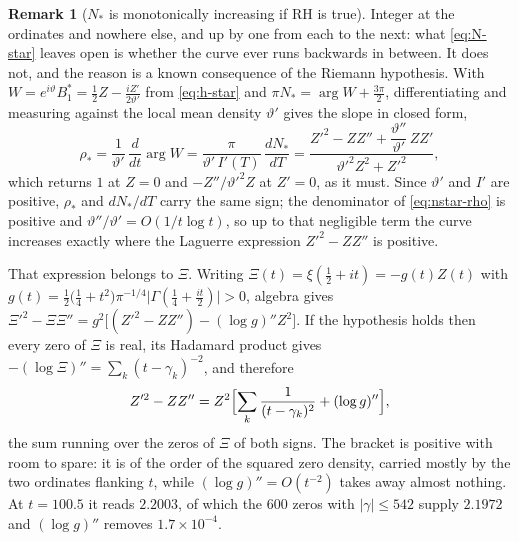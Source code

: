 \documentclass[11pt]{article}
\theoremstyle{definition}
\newtheorem{remark}[theorem]{Remark}
\begin{document}
\begin{remark}[$N_{\ast}$ is monotonically increasing if RH is true]
\label{rem:nstar-mono}
Integer at the ordinates and nowhere else, and up by one from each to the next:
what \eqref{eq:N-star} leaves open is whether the curve ever runs backwards in
between. It does not, and the reason is a known consequence of the Riemann
hypothesis. With $W=e^{i\vartheta}B_1^{\ast}=\tfrac12Z-\tfrac{iZ'}{2\vartheta'}$ from
\eqref{eq:h-star} and $\pi N_{\ast}=\arg W+\tfrac{3\pi}{2}$, differentiating
and measuring against the local mean density $\vartheta'$ gives the slope in closed
form,
\begin{equation}\label{eq:nstar-rho}
\rho_{\ast}=\frac{1}{\vartheta'}\,\frac{d}{dt}\arg W
=\frac{\pi}{\vartheta'\,I'(T)}\,\frac{dN_{\ast}}{dT}
=\frac{Z'^2-ZZ''+\dfrac{\vartheta''}{\vartheta'}\,ZZ'}{\vartheta'^2Z^2+Z'^2},
\end{equation}
which returns $1$ at $Z=0$ and $-Z''/\vartheta'^2Z$ at $Z'=0$, as it must. Since
$\vartheta'$ and $I'$ are positive, $\rho_{\ast}$ and $dN_{\ast}/dT$ carry the same sign;
the denominator of \eqref{eq:nstar-rho} is positive and
$\vartheta''/\vartheta'=O(1/t\log t)$, so up to that negligible term the curve
increases exactly where the Laguerre expression $Z'^2-ZZ''$ is positive.

That expression belongs to $\Xi$. Writing
$\Xi(t)=\xi(\tfrac12+it)=-g(t)Z(t)$ with
$g(t)=\tfrac12\bigl(\tfrac14+t^2\bigr)\pi^{-1/4}
\bigl|\Gamma(\tfrac14+\tfrac{it}{2})\bigr|>0$, algebra gives
$\Xi'^2-\Xi\Xi''=g^2\bigl[(Z'^2-ZZ'')-(\log g)''Z^2\bigr]$. If the hypothesis
holds then every zero of $\Xi$ is real, its Hadamard product gives
$-(\log\Xi)''=\sum_k(t-\gamma_k)^{-2}$, and therefore
\begin{equation}\label{eq:laguerre-Z}
Z'^2-ZZ''=Z^2\Bigl[\sum_k\frac{1}{(t-\gamma_k)^2}+(\log g)''\Bigr],
\end{equation}
the sum running over the zeros of $\Xi$ of both signs. The bracket is positive
with room to spare: it is of the order of the squared zero density, carried
mostly by the two ordinates flanking $t$, while $(\log g)''=O(t^{-2})$ takes
away almost nothing. At $t=100.5$ it reads $2.2003$, of which the $600$ zeros
with $|\gamma|\leq542$ supply $2.1972$ and $(\log g)''$ removes
$1.7\times10^{-4}$.


\end{remark}
\end{document}
